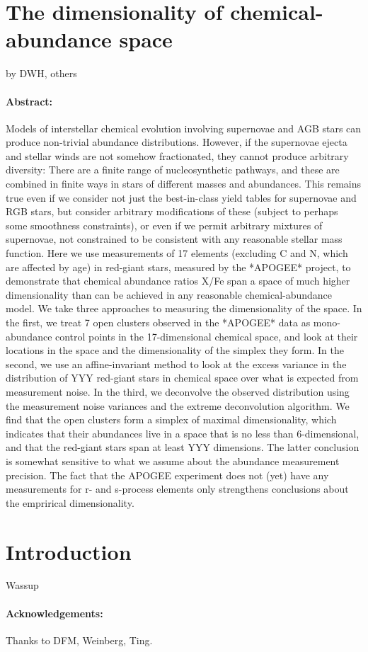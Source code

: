\documentclass[12pt, letterpaper]{article}
\begin{document}
\section*{The dimensionality of chemical-abundance space}

\noindent
by DWH, others

\paragraph{Abstract:}
Models of interstellar chemical evolution involving supernovae and AGB stars can produce non-trivial abundance distributions.
However, if the supernovae ejecta and stellar winds are not somehow fractionated, they cannot produce arbitrary diversity:
There are a finite range of nucleosynthetic pathways, and these are combined in finite ways in stars of different masses and abundances.
This remains true even if we consider not just the best-in-class yield tables for supernovae and RGB stars, but consider arbitrary modifications of these (subject to perhaps some smoothness constraints), or even if we permit arbitrary mixtures of supernovae, not constrained to be consistent with any reasonable stellar mass function.
Here we use measurements of 17 elements (excluding C and N, which are affected by age) in red-giant stars, measured by the *APOGEE* project, to demonstrate that chemical abundance ratios X/Fe span a space of much higher dimensionality than can be achieved in any reasonable chemical-abundance model.
We take three approaches to measuring the dimensionality of the space.
In the first, we treat 7 open clusters observed in the *APOGEE* data as mono-abundance control points in the 17-dimensional chemical space, and look at their locations in the space and the dimensionality of the simplex they form.
In the second, we use an affine-invariant method to look at the excess variance in the distribution of YYY red-giant stars in chemical space over what is expected from measurement noise.
In the third, we deconvolve the observed distribution using the measurement noise variances and the extreme deconvolution algorithm.
We find that the open clusters form a simplex of maximal dimensionality, which indicates that their abundances live in a space that is no less than 6-dimensional, and that the red-giant stars span at least YYY dimensions.
The latter conclusion is somewhat sensitive to what we assume about the abundance measurement precision.
The fact that the APOGEE experiment does not (yet) have any measurements for r- and s-process elements only strengthens conclusions about the emprirical dimensionality.

\section{Introduction}

Wassup

\paragraph{Acknowledgements:}
Thanks to DFM, Weinberg, Ting.
\end{document}

